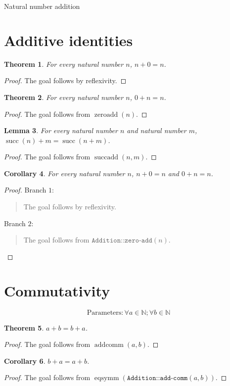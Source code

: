 \documentclass[11pt]{article}
\newtheorem{theorem}{Theorem}[section]
\newtheorem{lemma}[theorem]{Lemma}
\newtheorem{corollary}[theorem]{Corollary}
\theoremstyle{definition}
\begin{document}
\begin{center}
{\LARGE Natural number addition}
\end{center}
\section{Additive identities}
\label{ll:addition:identities}
\begin{theorem}
\label{ll:addition:add-zero}
For every natural number \(n\), \(n + 0 = n\).
\end{theorem}
\begin{proof}
The goal follows by reflexivity.
\end{proof}
\begin{theorem}
\label{ll:addition:zero-add}
For every natural number \(n\), \(0 + n = n\).
\end{theorem}
\begin{proof}
The goal follows from \(\operatorname{zeroadd}(n)\).
\end{proof}
\begin{lemma}
\label{ll:addition:succ-add}
For every natural number \(n\) and natural number \(m\), \(\operatorname{succ}(n) + m = \operatorname{succ}(n + m)\).
\end{lemma}
\begin{proof}
The goal follows from \(\operatorname{succadd}(n, m)\).
\end{proof}
\begin{corollary}
\label{ll:addition:both-identities}
For every natural number \(n\), \(n + 0 = n\) and \(0 + n = n\).
\end{corollary}
\begin{proof}
Branch \(1\):
\begin{quote}
The goal follows by reflexivity.
\end{quote}
Branch \(2\):
\begin{quote}
The goal follows from \(\texttt{Addition::zero-add}(n)\).
\end{quote}
\end{proof}
\section{Commutativity}
\label{ll:addition:commutativity}
\[\mathrm{Parameters}: \forall a \in \mathbb{N}; \forall b \in \mathbb{N}\]
\begin{theorem}
\label{ll:addition:add-comm}
\(a + b = b + a\).
\end{theorem}
\begin{proof}
The goal follows from \(\operatorname{addcomm}(a, b)\).
\end{proof}
\begin{corollary}
\label{ll:addition:add-comm-symm}
\(b + a = a + b\).
\end{corollary}
\begin{proof}
The goal follows from \(\operatorname{eqsymm}(\texttt{Addition::add-comm}(a, b))\).
\end{proof}
\end{document}
